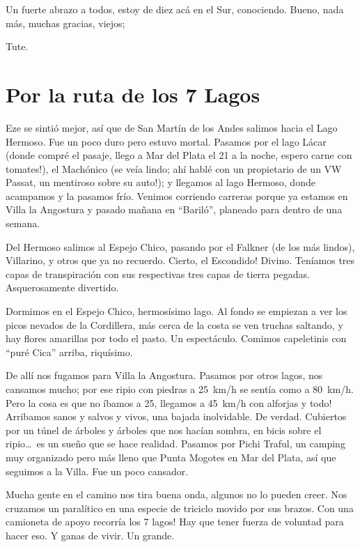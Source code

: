 Un fuerte abrazo a todos, estoy de diez ac\'a en el Sur, conociendo. Bueno, nada
m\'as, muchas gracias, viejos;

Tute.

\section{Por la ruta de los 7 Lagos}

Eze se sinti\'o mejor, as\'i que de San Mart\'in de los Andes salimos hacia el
Lago Hermoso. Fue un poco duro pero estuvo mortal. Pasamos por el lago L\'acar
(donde compr\'e el pasaje, llego a Mar del Plata el 21 a la noche,
\textexclamdown espero carne con tomates!), el Mach\'onico (se ve\'ia lindo;
ah\'i habl\'e con un propietario de un {\small VW} Passat, \textexclamdown un
mentiroso sobre su auto!); y llegamos al lago Hermoso, donde acampamos y la
pasamos fr\'io. Venimos corriendo carreras porque ya estamos en Villa la
Angostura y pasado ma\~nana en ``Baril\'o'', planeado para dentro de una semana.

Del Hermoso salimos al Espejo Chico, pasando por el Falkner (de los m\'as
lindos), Villarino, y otros que ya no recuerdo. \textexclamdown Cierto, el
Escondido! Divino. Ten\'iamos tres capas de transpiraci\'on con sus respectivas
tres capas de tierra pegadas. Asquerosamente divertido.

Dormimos en el Espejo Chico, hermos\'isimo lago. Al fondo se empiezan a ver los
picos nevados de la Cordillera, m\'as cerca de la costa se ven truchas saltando,
y hay flores amarillas por todo el pasto. Un espect\'aculo. Comimos capeletinis
con ``pur\'e Cica'' arriba, riqu\'isimo.

De all\'i nos fugamos para Villa la Angostura. Pasamos por otros lagos, nos
cansamos mucho; por ese ripio con piedras a 25~km/h se sent\'ia como a 80~km/h.
Pero la cosa es que no \'ibamos a 25, \textexclamdown llegamos a 45~km/h con
alforjas y todo! Arribamos sanos y salvos y vivos, una bajada inolvidable. De
verdad. Cubiertos por un t\'unel de \'arboles y \'arboles que nos hac\'ian
sombra, en bicis sobre el ripio\ldots\ es un sue\~no que se hace realidad.
Pasamos por Pichi Traful, un camping muy organizado pero m\'as lleno que Punta
Mogotes en Mar del Plata, as\'i que seguimos a la Villa. Fue un poco cansador.

Mucha gente en el camino nos tira buena onda, algunos no lo pueden creer. Nos
cruzamos un paral\'itico en una especie de triciclo movido por sus brazos.
\textexclamdown Con una camioneta de apoyo recorr\'ia los 7 lagos! Hay que tener
fuerza de voluntad para hacer eso. Y ganas de vivir. Un grande.

